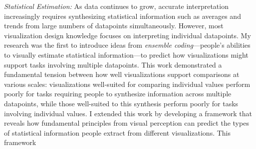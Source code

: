 \documentclass[11pt]{article}
\begin{document}
\emph{Statistical Estimation: }As data continues to grow, accurate interpretation increasingly requires synthesizing 
statistical information such as averages and trends from large numbers of datapoints simultaneously.
However, most visualization design knowledge focuses on interpreting individual datapoints.
My research was the first to introduce ideas from \emph{ensemble coding}---people's abilities to visually estimate statistical information---to predict how visualizations might support tasks involving multiple datapoints. 
This work demonstrated a fundamental tension between how well visualizations support comparisons at various scales: visualizations well-suited for comparing individual values perform poorly for tasks requiring people to synthesize information across multiple datapoints, while those well-suited to this synthesis perform poorly for tasks involving individual values. 
I extended this work by developing a framework that reveals how fundamental principles from visual perception can predict the types of statistical information people extract from different visualizations. This framework 
\end{document}
